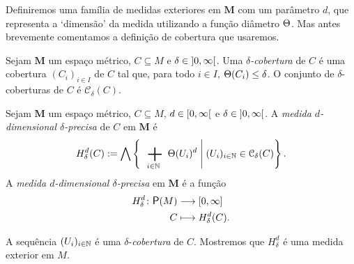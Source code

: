 Definiremos uma família de medidas exteriores em $\bm M$ com um parâmetro $d$, que representa a `dimensão' da medida utilizando a função diâmetro $\Theta$. Mas antes brevemente comentamos a definição de cobertura que usaremos.

\begin{definition}
Sejam $\bm M$ um espaço métrico, $C \subseteq M$ e $\delta \in \left]{0},{\infty}\right[$. Uma \emph{$\delta$-cobertura} de $C$ é uma cobertura $(C_i)_{i \in I}$ de $C$ tal que, para todo $i \in I$, $\Theta(C_i) \leq \delta$. O conjunto de $\delta$-coberturas de $C$ é $\mathcal C_\delta (C)$.
\end{definition}

\begin{definition}
Sejam $\bm M$ um espaço métrico, $C \subseteq M$, $d \in \left[{0},{\infty}\right[$ e $\delta \in \left]{0},{\infty}\right[$. A \emph{medida $d$-dimensional $\delta$-precisa} de $C$ em $\bm M$ é
	\begin{equation*}
	H^d_\delta(C) := \inf\set{\sum_{i \in \N} \diam(U_i)^d}{(U_i)_{i \in \N} \in \mathcal C_\delta(C)}.
	\end{equation*}
 A \emph{medida $d$-dimensional $\delta$-precisa} em $\bm M$ é a função
 	\begin{align*}
 	\func{H^d_\delta}{\p(M)}{\intff{0}{\infty}}{C}{H^d_\delta(C)}.
 	\end{align*}
\end{definition}

A sequência $(U_i)_{i \in \mathbb{N}}$ é uma $\delta$-\emph{cobertura} de $C$. Mostremos que $H^d_\delta$ é uma medida exterior em $M$.

